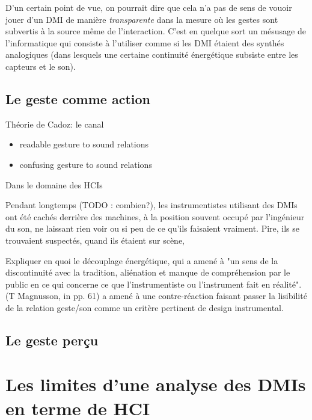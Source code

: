 D'un certain point de vue, on pourrait dire que cela n'a pas de sens de vouoir jouer d'un DMI de manière \textit{transparente} dans la mesure où les gestes sont subvertis à la source même de l'interaction. C'est en quelque sort un mésusage de l'informatique qui consiste à l'utiliser comme si les DMI étaient des synthés analogiques (dans lesquels une certaine continuité énergétique subsiste entre les capteurs et le son).


\subsection{Le geste comme action}

 \cite{wanderley_controle_1999}



Théorie de Cadoz: le canal

\vspace{-1em}
\begin{itemize}[noitemsep]
\item readable gesture to sound relations
\item confusing gesture to sound relations
\end{itemize}


Dans le domaine des \glspl{HCI} 

Pendant longtemps (TODO : combien?), les instrumentistes utilisant des \glspl{DMI} ont été cachés derrière des machines, à la position souvent occupé par l'ingénieur du son, ne laissant rien voir ou si peu de ce qu'ils faisaient vraiment. Pire, ils se trouvaient suspectés, quand ils étaient sur scène, 


Expliquer en quoi le découplage énergétique, qui a amené à "un sens de la discontinuité avec la tradition, aliénation et manque de compréhension par le public en ce qui concerne ce que l'instrumentiste ou l'instrument fait en réalité". (T Magnusson, in \cite{magnusson_sonic_2019} pp. 61) a amené à une contre-réaction faisant passer la lisibilité de la relation geste/son comme un critère pertinent de design instrumental.

\subsection{Le geste perçu}


\section{Les limites d'une analyse des DMIs en terme de HCI}
\label{sec:transparency:limitesHCI}

